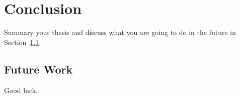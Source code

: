 \chapter{Conclusion}
\label{cha:conclusion}
Summary your thesis and discuss what you are going to do in the future in Section~\ref{sec:future}.


\section{Future Work}
\label{sec:future}
Good luck.



